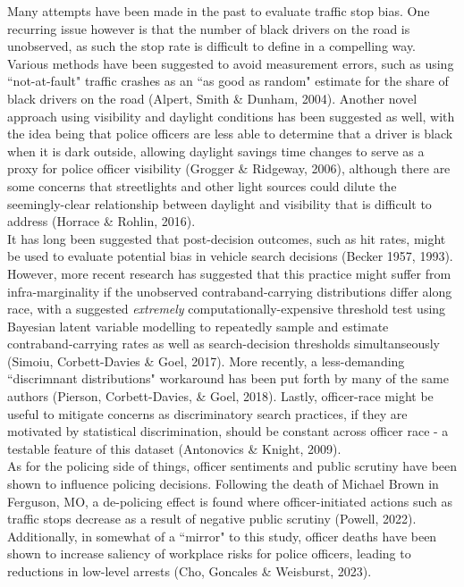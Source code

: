 \documentclass[12pt,a4paper]{article}
\begin{document}
Many attempts have been made in the past to evaluate traffic stop bias. One recurring issue however is that the number of black drivers on the road is unobserved, as such the stop rate is difficult to define in a compelling way. Various methods have been suggested to avoid measurement errors, such as using ``not-at-fault" traffic crashes as an ``as good as random" estimate for the share of black drivers on the road (Alpert, Smith \& Dunham, 2004). Another novel approach using visibility and daylight conditions has been suggested as well, with the idea being that police officers are less able to determine that a driver is black when it is dark outside, allowing daylight savings time changes to serve as a proxy for police officer visibility (Grogger \& Ridgeway, 2006), although there are some concerns that streetlights and other light sources could dilute the seemingly-clear relationship between daylight and visibility that is difficult to address (Horrace \& Rohlin, 2016). \\

It has long been suggested that post-decision outcomes, such as hit rates, might be used to evaluate potential bias in vehicle search decisions (Becker 1957, 1993). However, more recent research has suggested that this practice might suffer from infra-marginality if the unobserved contraband-carrying distributions differ along race, with a suggested \textit{extremely} computationally-expensive threshold test using Bayesian latent variable modelling to repeatedly sample and estimate contraband-carrying rates as well as search-decision thresholds simultanseously (Simoiu, Corbett-Davies \& Goel, 2017). More recently, a less-demanding ``discrimnant distributions" workaround has been put forth by many of the same authors (Pierson, Corbett-Davies, \& Goel, 2018). Lastly, officer-race might be useful to mitigate concerns as discriminatory search practices, if they are motivated by statistical discrimination, should be constant across officer race - a testable feature of this dataset (Antonovics \& Knight, 2009). \\

As for the policing side of things, officer sentiments and public scrutiny have been shown to influence policing decisions. Following the death of Michael Brown in Ferguson, MO, a de-policing effect is found where officer-initiated actions such as traffic stops decrease as a result of negative public scrutiny (Powell, 2022). Additionally, in somewhat of a ``mirror" to this study, officer deaths have been shown to increase saliency of workplace risks for police officers, leading to reductions in low-level arrests (Cho, Goncales \& Weisburst, 2023). \\
\end{document}
